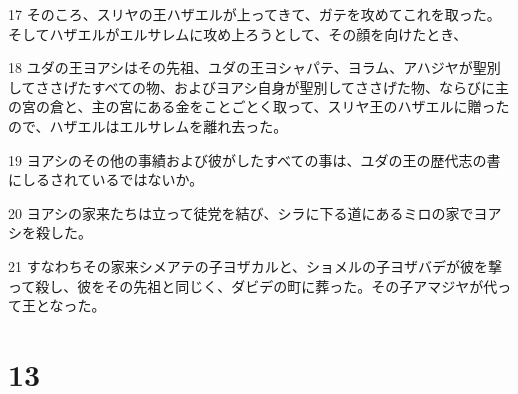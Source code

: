 \par 17 そのころ、スリヤの王ハザエルが上ってきて、ガテを攻めてこれを取った。そしてハザエルがエルサレムに攻め上ろうとして、その顔を向けたとき、
\par 18 ユダの王ヨアシはその先祖、ユダの王ヨシャパテ、ヨラム、アハジヤが聖別してささげたすべての物、およびヨアシ自身が聖別してささげた物、ならびに主の宮の倉と、主の宮にある金をことごとく取って、スリヤ王のハザエルに贈ったので、ハザエルはエルサレムを離れ去った。
\par 19 ヨアシのその他の事績および彼がしたすべての事は、ユダの王の歴代志の書にしるされているではないか。
\par 20 ヨアシの家来たちは立って徒党を結び、シラに下る道にあるミロの家でヨアシを殺した。
\par 21 すなわちその家来シメアテの子ヨザカルと、ショメルの子ヨザバデが彼を撃って殺し、彼をその先祖と同じく、ダビデの町に葬った。その子アマジヤが代って王となった。

\chapter{13}

